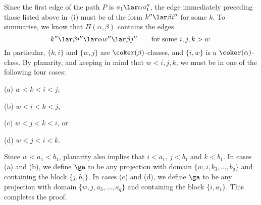 Since the first edge of the path $P$ is $a_1\lar\alpha a_1''$, the edge immediately preceding those listed above in~(i) must be of the form $k''\lar\beta i''$ for some $k$.  To summarise, we know that $\Pi(\alpha,\beta)$ contains the edges
\[
k''\lar\beta i''\lar\alpha w''\lar\beta j'' \qquad\text{for some $i,j,k>w$.}
\]
In particular, $\{k,i\}$ and $\{w,j\}$ are $\coker(\beta)$-classes, and $\{i,w\}$ is a $\coker(\alpha)$-class.  By planarity, and keeping in mind that $w<i,j,k$, we must be in one of the following four cases:
\begin{itemize}\begin{multicols}{4}
\item[(a)] $w<k<i<j$,
\item[(b)] $w<i<k<j$,
\item[(c)] $w<j<k<i$, or
\item[(d)] $w<j<i<k$.
\end{multicols}\end{itemize}
Since $w<a_1<b_1$, planarity also implies that $i<a_1$, $j<b_1$ and $k<b_1$.  In cases (a) and (b), we define $\ga$ to be any projection with domain $\{w,i,b_3,\ldots,b_q\}$ and containing the block $\{j,b_1\}$.  In cases (c) and (d), we define $\ga$ to be any projection with domain $\{w,j,a_3,\ldots,a_q\}$ and containing the block $\{i,a_1\}$.  This completes the proof. \epf





